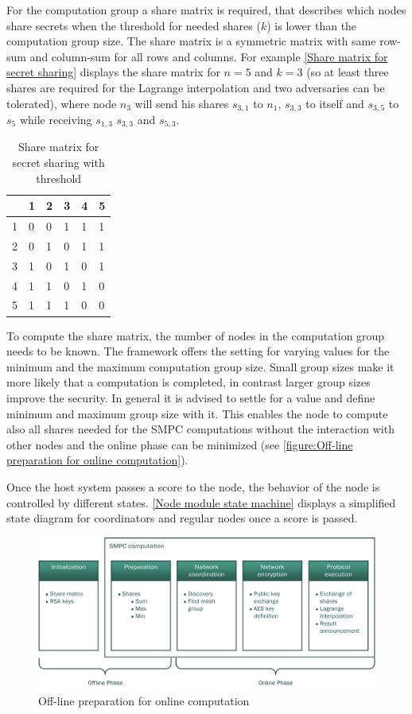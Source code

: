 For the computation group a share matrix is required, that describes which nodes share secrets when the threshold for needed shares ($k$) is lower than the computation group size. The share matrix is a symmetric matrix with same row-sum and column-sum for all rows and columns. For example \autoref{Share matrix for secret sharing} displays the share matrix for $n=5$ and $k=3$ (so at least three shares are required for the Lagrange interpolation and two adversaries can be tolerated), where node $n_3$ will send his shares $s_{3,1}$ to $n_1$, $s_{3,3}$ to itself and $s_{3,5}$ to $s_5$ while receiving $s_{1,3}$ $s_{3,3}$ and $s_{5,3}$.
\begin{table}[]
	\centering
	\caption[Share matrix for secret sharing]{Share matrix for secret sharing with threshold}
	\label{Share matrix for secret sharing}
	\begin{tabular}{l|lllll}
		& 1 & 2 & 3 & 4 & 5 \\ \hline
		1 & 0 & 0 & 1 & 1 & 1 \\
		2 & 0 & 1 & 0 & 1 & 1 \\
		3 & 1 & 0 & 1 & 0 & 1 \\
		4 & 1 & 1 & 0 & 1 & 0 \\
		5 & 1 & 1 & 1 & 0 & 0
	\end{tabular}
\end{table}

To compute the share matrix, the number of nodes in the computation group needs to be known. The framework offers the setting for varying values for the minimum and the maximum computation group size. Small group sizes make it more likely that a computation is completed, in contrast larger group sizes improve the security. In general it is advised to settle for a value and define minimum and maximum group size with it. This enables the node to compute also all shares needed for the \gls{SMPC} computations without the interaction with other nodes and the online phase can be minimized (see \autoref{figure:Off-line preparation for online computation}).

Once the host system passes a score to the node, the behavior of the node is controlled by different states. \autoref{Node module state machine} displays a simplified state diagram for coordinators and regular nodes once a score is passed.

\begin{figure}[!htbp] %
	\caption{Off-line preparation for online computation} \label{figure:Off-line preparation for online computation}
	\includegraphics[scale=1.0]{figures/node_phases.png}
\end{figure}

